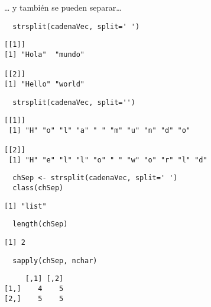 \documentclass[xcolor={usenames,svgnames,dvipsnames}]{beamer}
\begin{document}
\begin{frame}[fragile,label=sec-3-5]{\ldots{} y también se pueden separar\ldots{}}
 \lstset{language=R,label= ,caption= ,numbers=none}
\begin{lstlisting}
  strsplit(cadenaVec, split=' ')
\end{lstlisting}

\begin{verbatim}
[[1]]
[1] "Hola"  "mundo"

[[2]]
[1] "Hello" "world"
\end{verbatim}

\lstset{language=R,label= ,caption= ,numbers=none}
\begin{lstlisting}
  strsplit(cadenaVec, split='')
\end{lstlisting}

\begin{verbatim}
[[1]]
 [1] "H" "o" "l" "a" " " "m" "u" "n" "d" "o"

[[2]]
 [1] "H" "e" "l" "l" "o" " " "w" "o" "r" "l" "d"
\end{verbatim}

\lstset{language=R,label= ,caption= ,numbers=none}
\begin{lstlisting}
  chSep <- strsplit(cadenaVec, split=' ')
  class(chSep)
\end{lstlisting}

\begin{verbatim}
[1] "list"
\end{verbatim}

\lstset{language=R,label= ,caption= ,numbers=none}
\begin{lstlisting}
  length(chSep)
\end{lstlisting}

\begin{verbatim}
[1] 2
\end{verbatim}

\lstset{language=R,label= ,caption= ,numbers=none}
\begin{lstlisting}
  sapply(chSep, nchar)
\end{lstlisting}

\begin{verbatim}
     [,1] [,2]
[1,]    4    5
[2,]    5    5
\end{verbatim}
\end{frame}
\end{document}
